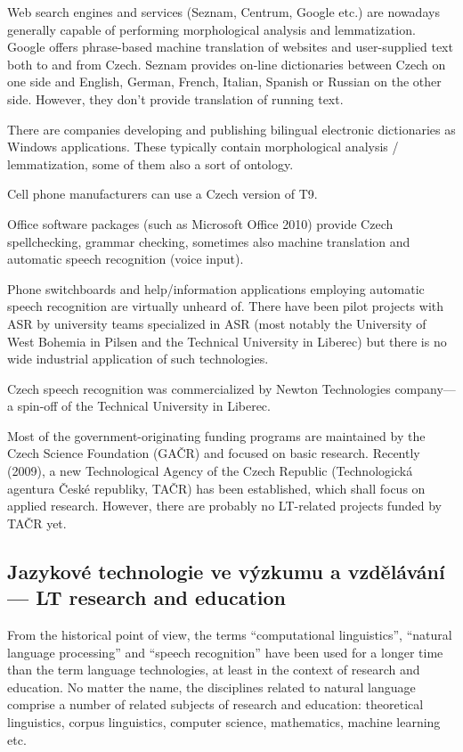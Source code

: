 \documentclass[]{../../metanetpaper}
\begin{document}
\begin{multicols}{2}
Web search engines and services (Seznam, Centrum, Google etc.) are nowadays generally capable of performing morphological analysis and lemmatization. Google offers phrase-based machine translation of websites and user-supplied text both to and from Czech. Seznam provides on-line dictionaries between Czech on one side and English, German, French, Italian, Spanish or Russian on the other side. However, they don’t provide translation of running text.

There are companies developing and publishing bilingual electronic dictionaries as Windows applications. These typically contain morphological analysis / lemmatization, some of them also a sort of ontology.

Cell phone manufacturers can use a Czech version of T9.

Office software packages (such as Microsoft Office 2010) provide Czech spellchecking, grammar checking, sometimes also machine translation and automatic speech recognition (voice input).

Phone switchboards and help/information applications employing automatic speech recognition are virtually unheard of. There have been pilot projects with ASR by university teams specialized in ASR (most notably the University of West Bohemia in Pilsen and the Technical University in Liberec) but there is no wide industrial application of such technologies.

Czech speech recognition was commercialized by Newton Technologies company—a spin-off of the Technical University in Liberec.

Most of the government-originating funding programs are maintained by the Czech Science Foundation (GAČR) and focused on basic research. Recently (2009), a new Technological Agency of the Czech Republic (Technologická agentura České republiky, TAČR) has been established, which shall focus on applied research. However, there are probably no LT-related projects funded by TAČR yet.

\subsection{Jazykové technologie ve výzkumu a vzdělávání --- LT research and education}

From the historical point of view, the terms ``computational linguistics'', ``natural language processing'' and ``speech recognition'' have been used for a longer time than the term language technologies, at least in the context of research and education. No matter the name, the disciplines related to natural language comprise a number of related subjects of research and education: theoretical linguistics, corpus linguistics, computer science, mathematics, machine learning etc.


\end{multicols}
\end{document}

